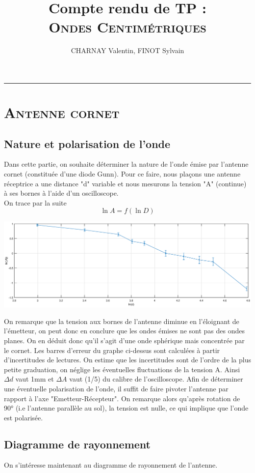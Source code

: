 \documentclass[12pt,a4paper]{article}
\author{CHARNAY Valentin, FINOT Sylvain}
\title{Compte rendu de TP :\\ \scshape Ondes Centimétriques}
\begin{document}
\maketitle
\rule{\linewidth}{0.4pt}
\section{\scshape Antenne cornet}
\subsection{Nature et polarisation de l'onde}
Dans cette partie, on souhaite déterminer la nature de l'onde émise par l'antenne cornet (constituée d'une diode Gunn). Pour ce faire, nous plaçons une antenne réceptrice a une distance "d" variable et nous mesurons la tension "A" (continue) à ses bornes à l'aide d'un oscilloscope.\\
On trace par la suite
$$\ln A = f(\ln D)$$
\begin{bigcenter}
\includegraphics[scale=0.5]{matlab/lnA}
\end{bigcenter}
On remarque que la tension aux bornes de l'antenne diminue en l'éloignant de l'émetteur, on peut donc en conclure que les ondes émises ne sont pas des ondes planes. On en déduit donc qu'il s'agit d'une onde sphérique mais concentrée par le cornet. Les barres d'erreur du graphe ci-dessus sont calculées à partir d'incertitudes de lectures. On estime que les incertitudes sont de l'ordre de la plus petite graduation, on néglige les éventuelles fluctuations de la tension A. Ainsi $\Delta d$ vaut 1mm et $\Delta A$ vaut (1/5) du calibre de l'oscilloscope.
Afin de déterminer une éventuelle polarisation de l'onde, il suffit de faire pivoter l'antenne par rapport à l'axe "Emetteur-Récepteur". On remarque alors qu'après rotation de 90° (i.e l'antenne parallèle au sol), la tension est nulle, ce qui implique que l'onde est polarisée.
\subsection{Diagramme de rayonnement}
On s'intéresse maintenant au diagramme de rayonnement de l'antenne.
\end{document}
